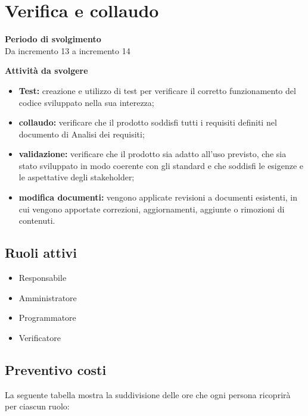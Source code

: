\section{Verifica e collaudo}

\textbf{Periodo di svolgimento}
\\ Da incremento 13 a incremento 14

\textbf{Attività da svolgere}
    \begin{itemize}
        \item \textbf{Test:} creazione e utilizzo di test per verificare il corretto funzionamento del codice sviluppato nella sua interezza; 
        \item \textbf{collaudo:} verificare che il prodotto soddisfi tutti i requisiti definiti nel documento di Analisi dei requisiti;
        \item \textbf{validazione:} verificare che il prodotto sia adatto all'uso previsto, che sia stato sviluppato in modo coerente con gli standard e che soddisfi le esigenze e le aspettative degli stakeholder;
        \item \textbf{modifica documenti:} vengono applicate revisioni a documenti esistenti, in cui vengono apportate correzioni, aggiornamenti, aggiunte o rimozioni di contenuti.
    \end{itemize}

\subsection{Ruoli attivi}
\begin{itemize}
    \item Responsabile 
    \item Amministratore 
    \item Programmatore 
    \item Verificatore 
\end{itemize}

\subsection{Preventivo costi}

La seguente tabella mostra la suddivisione delle ore che ogni persona ricoprirà per ciascun ruolo:

